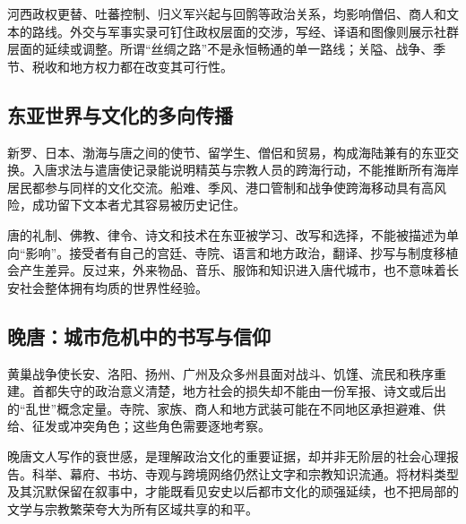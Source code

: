 河西政权更替、吐蕃控制、归义军兴起与回鹘等政治关系，均影响僧侣、商人和文本的路线。外交与军事实录可钉住政权层面的交涉，写经、译语和图像则展示社群层面的延续或调整。所谓“丝绸之路”不是永恒畅通的单一路线；关隘、战争、季节、税收和地方权力都在改变其可行性。

\subsection{东亚世界与文化的多向传播}

新罗、日本、渤海与唐之间的使节、留学生、僧侣和贸易，构成海陆兼有的东亚交换。入唐求法与遣唐使记录能说明精英与宗教人员的跨海行动，不能推断所有海岸居民都参与同样的文化交流。船难、季风、港口管制和战争使跨海移动具有高风险，成功留下文本者尤其容易被历史记住。

唐的礼制、佛教、律令、诗文和技术在东亚被学习、改写和选择，不能被描述为单向“影响”。接受者有自己的宫廷、寺院、语言和地方政治，翻译、抄写与制度移植会产生差异。反过来，外来物品、音乐、服饰和知识进入唐代城市，也不意味着长安社会整体拥有均质的世界性经验。

\subsection{晚唐：城市危机中的书写与信仰}

黄巢战争使长安、洛阳、扬州、广州及众多州县面对战斗、饥馑、流民和秩序重建。首都失守的政治意义清楚，地方社会的损失却不能由一份军报、诗文或后出的“乱世”概念定量。寺院、家族、商人和地方武装可能在不同地区承担避难、供给、征发或冲突角色；这些角色需要逐地考察。

晚唐文人写作的衰世感，是理解政治文化的重要证据，却并非无阶层的社会心理报告。科举、幕府、书坊、寺观与跨境网络仍然让文字和宗教知识流通。将材料类型及其沉默保留在叙事中，才能既看见安史以后都市文化的顽强延续，也不把局部的文学与宗教繁荣夸大为所有区域共享的和平。
